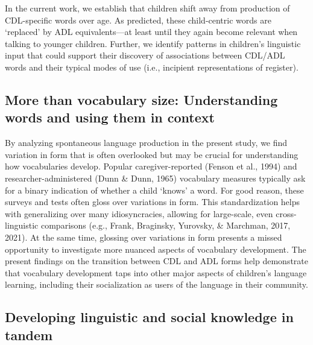 \documentclass[10pt, letterpaper]{article}
\begin{document}
In the current work, we establish that children shift away from
production of CDL-specific words over age. As predicted, these
child-centric words are `replaced' by ADL equivalents---at least until
they again become relevant when talking to younger children. Further, we
identify patterns in children's linguistic input that could support
their discovery of associations between CDL/ADL words and their typical
modes of use (i.e., incipient representations of register).

\hypertarget{more-than-vocabulary-size-understanding-words-and-using-them-in-context}{%
\subsection{More than vocabulary size: Understanding words and using
them in
context}\label{more-than-vocabulary-size-understanding-words-and-using-them-in-context}}

By analyzing spontaneous language production in the present study, we
find variation in form that is often overlooked but may be crucial for
understanding how vocabularies develop. Popular caregiver-reported
(Fenson et al., 1994) and researcher-administered (Dunn \& Dunn, 1965)
vocabulary measures typically ask for a binary indication of whether a
child `knows' a word. For good reason, these surveys and tests often
gloss over variations in form. This standardization helps with
generalizing over many idiosyncracies, allowing for large-scale, even
cross-linguistic comparisons (e.g., Frank, Braginsky, Yurovsky, \&
Marchman, 2017, 2021). At the same time, glossing over variations in
form presents a missed opportunity to investigate more nuanced aspects
of vocabulary development. The present findings on the transition
between CDL and ADL forms help demonstrate that vocabulary development
taps into other major aspects of children's language learning, including
their socialization as users of the language in their community.

\hypertarget{developing-linguistic-and-social-knowledge-in-tandem}{%
\subsection{Developing linguistic and social knowledge in
tandem}\label{developing-linguistic-and-social-knowledge-in-tandem}}
\end{document}
